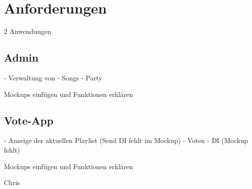 \section{Anforderungen}

2 Anwendungen

\subsection{Admin}
- Verwaltung von
  - Songs
  - Party
  
Mockups einfügen und Funktionen erklären

\subsection{Vote-App}
- Anzeige der aktuellen Playlist (Send DI fehlt im Mockup)
- Voten
- DI (Mockup fehlt)

Mockups einfügen und Funktionen erklären

Chris